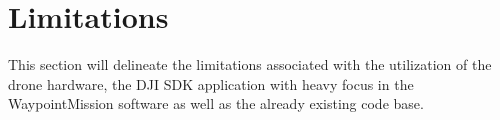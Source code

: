 











\section{Limitations} \label{Limitations}
This section will delineate the limitations associated with the utilization of the drone hardware, the DJI SDK application with heavy focus in the WaypointMission software as well as the already existing code base. 

